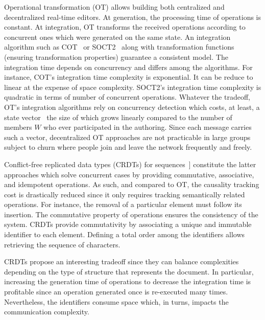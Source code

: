 Operational transformation (OT) allows building both centralized and
decentralized real-time editors. At generation, the processing time of
operations is constant. At integration, OT transforms the received operations
according to concurrent ones which were generated on the same state. An
integration algorithm such as COT~\cite{sun2009contextbased} or
SOCT2~\cite{vidot2000copies} along with transformation functions (ensuring
transformation properties) guarantee a consistent model. The integration time
depends on concurrency and differs among the algorithms.  For instance, COT's
integration time complexity is exponential. It can be reduce to linear at the
expense of space complexity. SOCT2's integration time complexity is quadratic in
terms of number of concurrent operations.  Whatever the tradeoff, OT's
integration algorithms rely on concurrency detection which costs, at least, a
state vector~\cite{charronbost1991concerning} the size of which grows linearly
compared to the number of members $W$ who ever participated in the
authoring. Since each message carries such a vector, decentralized OT approaches
are not practicable in large groups subject to churn where people join and leave
the network frequently and freely. %

Conflict-free replicated data types (CRDTs) for
sequences~\cite{shapiro2011comprehensive, shapiro2011conflict}] constitute the
latter approaches which solve concurrent cases by providing commutative,
associative, and idempotent operations. As such, and compared to OT, the
causality tracking cost is drastically reduced since it only requires tracking
semantically related operations. For instance, the removal of a particular
element must follow its insertion. The commutative property of operations
ensures the consistency of the system. CRDTs provide commutativity by
associating a unique and immutable identifier to each element. Defining a total
order among the identifiers allows retrieving the sequence of characters.

\noindent CRDTs propose an interesting tradeoff since they can balance complexities
depending on the type of structure that represents the document.  In particular,
increasing the generation time of operations to decrease the integration time is
profitable since an operation generated once is re-executed many
times. Nevertheless, the identifiers consume space which, in turns, impacts the
communication complexity.

